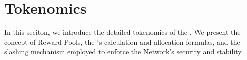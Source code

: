\section{Tokenomics}
\label{sec:tokenomics}

In this seciton, we introduce the detailed tokenomics of the . We present the concept of Reward Pools, the 's calculation and allocation formulas, and the slashing mechanism employed to enforce the Network's security and stability.








